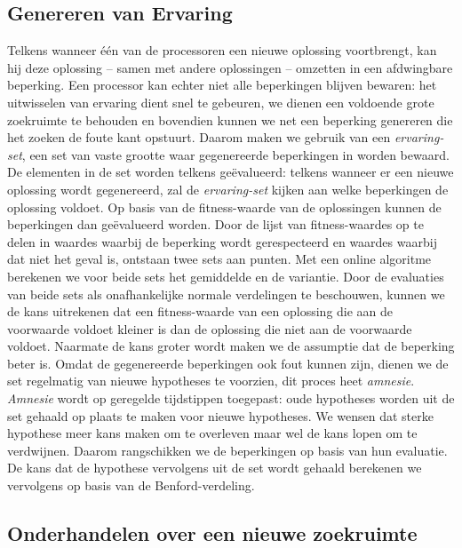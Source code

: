 \subsection{Genereren van Ervaring}
 
Telkens wanneer \'e\'en van de processoren een nieuwe oplossing voortbrengt, kan hij deze oplossing -- samen met andere oplossingen -- omzetten in een afdwingbare beperking. Een processor kan echter niet alle beperkingen blijven bewaren: het uitwisselen van ervaring dient snel te gebeuren, we dienen een voldoende grote zoekruimte te behouden en bovendien kunnen we net een beperking genereren die het zoeken de foute kant opstuurt. Daarom maken we gebruik van een \emph{ervaring-set}, een set van vaste grootte waar gegenereerde beperkingen in worden bewaard. De elementen in de set worden telkens ge\"evalueerd: telkens wanneer er een nieuwe oplossing wordt gegenereerd, zal de \emph{ervaring-set} kijken aan welke beperkingen de oplossing voldoet. Op basis van de fitness-waarde van de oplossingen kunnen de beperkingen dan ge\"evalueerd worden. Door de lijst van fitness-waardes op te delen in waardes waarbij de beperking wordt gerespecteerd en waardes waarbij dat niet het geval is, ontstaan twee sets aan punten. Met een online algoritme\cite[p. 232]{citeulike:175026} berekenen we voor beide sets het gemiddelde en de variantie. Door de evaluaties van beide sets als onafhankelijke normale verdelingen te beschouwen, kunnen we de kans uitrekenen dat een fitness-waarde van een oplossing die aan de voorwaarde voldoet kleiner is dan de oplossing die niet aan de voorwaarde voldoet. Naarmate de kans groter wordt maken we de assumptie dat de beperking beter is. Omdat de gegenereerde beperkingen ook fout kunnen zijn, dienen we de set regelmatig van nieuwe hypotheses te voorzien, dit proces heet \emph{amnesie}. \emph{Amnesie} wordt op geregelde tijdstippen toegepast: oude hypotheses worden uit de set gehaald op plaats te maken voor nieuwe hypotheses. We wensen dat sterke hypothese meer kans maken om te overleven maar wel de kans lopen om te verdwijnen. Daarom rangschikken we de beperkingen op basis van hun evaluatie. De kans dat de hypothese vervolgens uit de set wordt gehaald berekenen we vervolgens op basis van de Benford-verdeling\cite{citeulike:748130}.

\subsection{Onderhandelen over een nieuwe zoekruimte}

